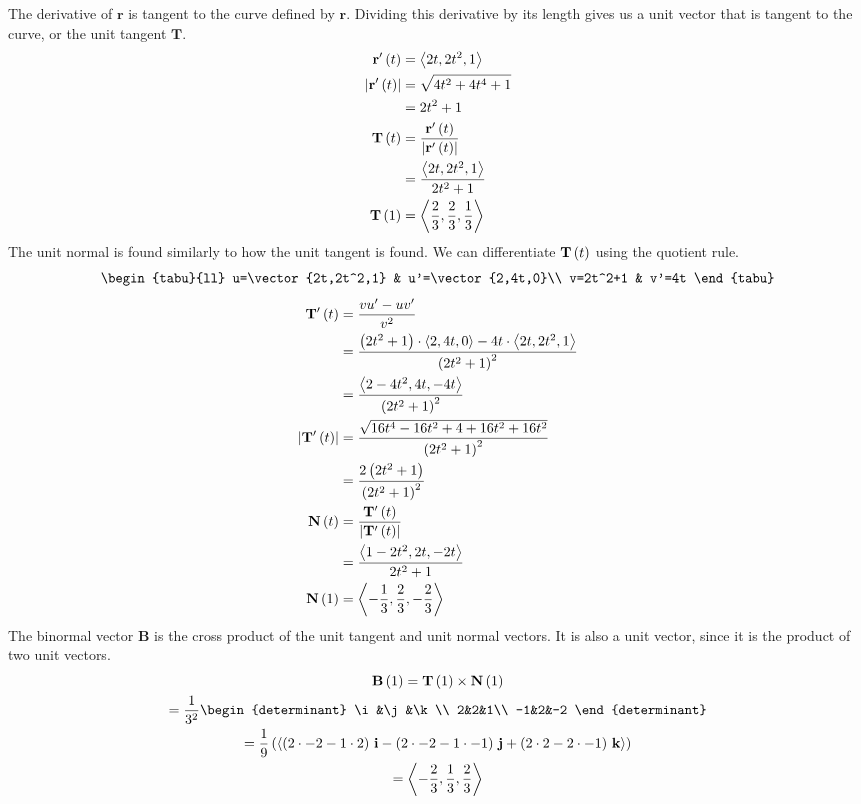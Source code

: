\documentclass[12pt]{article}
\begin{document}
The derivative of $\mathbf{r}$ is tangent to the curve defined by $\mathbf{r}$. Dividing this derivative by its length gives us
a unit vector that is tangent to the curve, or the unit tangent $\mathbf{T}$.
%
\begin{align*}
\mathbf{r}'\left({t}\right)&=\left\langle{2t,2t^2,1}\right\rangle\\
\left|{\mathbf{r}'\left({t}\right)}\right|&=\sqrt{4t^2+4t^4+1}\\
&=2t^2+1\\
\mathbf{T}\left({t}\right)&=\frac{\mathbf{r}'\left({t}\right)}{\left|{\mathbf{r}'\left({t}\right)}\right|}\\
&=\frac{\left\langle{2t,2t^2,1}\right\rangle}{2t^2+1}\\
\mathbf{T}\left({1}\right)&=\left\langle{\frac{2}{3},\frac{2}{3},\frac{1}{3}}\right\rangle
\end{align*}
%
The unit normal is found similarly to how the unit tangent is found. We can differentiate $\mathbf{T}\left({t}\right)$ using the
quotient rule.
%
\begin{gather*}
\begin{tabu}{ll}
u=\vector{2t,2t^2,1} & u'=\vector{2,4t,0}\\
v=2t^2+1 & v'=4t
\end{tabu}
\end{gather*}
\begin{align*}
\mathbf{T}'\left({t}\right)&=\frac{vu'-uv'}{v^2}\\
&=\frac{\left({2t^2+1}\right)\cdot\left\langle{2,4t,0}\right\rangle-4t\cdot\left\langle{2t,2t^2,1}\right\rangle}{\left({2t^2+1}\right)^2}\\
&=\frac{\left\langle{2-4t^2,4t,-4t}\right\rangle}{\left({2t^2+1}\right)^2}\\
\left|{\mathbf{T}'\left({t}\right)}\right|&=\frac{\sqrt{16t^4-16t^2+4+16t^2+16t^2}}{\left({2t^2+1}\right)^2}\\
&=\frac{2\left({2t^2+1}\right)}{\left({2t^2+1}\right)^2}\\
\mathbf{N}\left({t}\right)&=\frac{\mathbf{T}'\left({t}\right)}{\left|{\mathbf{T}'\left({t}\right)}\right|}\\
&=\frac{\left\langle{1-2t^2,2t,-2t}\right\rangle}{2t^2+1}\\
\mathbf{N}\left({1}\right)&=\left\langle{-\frac{1}{3},\frac{2}{3},-\frac{2}{3}}\right\rangle
\end{align*}
%
The binormal vector $\mathbf{B}$ is the cross product of the unit tangent and unit normal vectors. It is also a unit vector, since it is the
product of two unit vectors.
%
\begin{gather*}
\mathbf{B}\paren{1}=\mathbf{T}\paren{1}\cross\mathbf{N}\paren{1}\\
=\frac{1}{3^2}\begin{determinant}
\i&\j&\k\\
2&2&1\\
-1&2&-2
\end{determinant}\\
=\frac{1}{9}\paren{\vector{\paren{2\times{-2}-1\times{2}}\i-\paren{2\times{-2}-1\times{-1}}\j+\paren{2\times{2}-2\times{-1}}\k}}\\
=\vector{-\frac{2}{3},\frac{1}{3},\frac{2}{3}}
\end{gather*}
\end{document}
